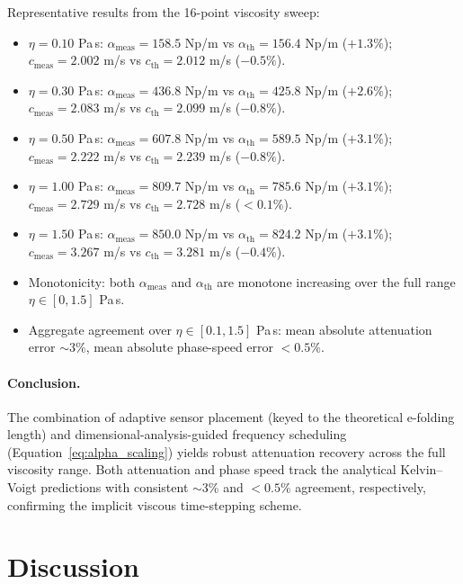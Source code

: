 \documentclass[11pt]{article}
\begin{document}
Representative results from the 16-point viscosity sweep:
\begin{itemize}[leftmargin=1.5em]
\item \(\eta=0.10\) Pa\,s: \(\alpha_{\mathrm{meas}}=158.5\) Np/m vs \(\alpha_{\mathrm{th}}=156.4\) Np/m (\(+1.3\%\)); \(c_{\mathrm{meas}}=2.002\) m/s vs \(c_{\mathrm{th}}=2.012\) m/s (\(-0.5\%\)).
\item \(\eta=0.30\) Pa\,s: \(\alpha_{\mathrm{meas}}=436.8\) Np/m vs \(\alpha_{\mathrm{th}}=425.8\) Np/m (\(+2.6\%\)); \(c_{\mathrm{meas}}=2.083\) m/s vs \(c_{\mathrm{th}}=2.099\) m/s (\(-0.8\%\)).
\item \(\eta=0.50\) Pa\,s: \(\alpha_{\mathrm{meas}}=607.8\) Np/m vs \(\alpha_{\mathrm{th}}=589.5\) Np/m (\(+3.1\%\)); \(c_{\mathrm{meas}}=2.222\) m/s vs \(c_{\mathrm{th}}=2.239\) m/s (\(-0.8\%\)).
\item \(\eta=1.00\) Pa\,s: \(\alpha_{\mathrm{meas}}=809.7\) Np/m vs \(\alpha_{\mathrm{th}}=785.6\) Np/m (\(+3.1\%\)); \(c_{\mathrm{meas}}=2.729\) m/s vs \(c_{\mathrm{th}}=2.728\) m/s (\(<0.1\%\)).
\item \(\eta=1.50\) Pa\,s: \(\alpha_{\mathrm{meas}}=850.0\) Np/m vs \(\alpha_{\mathrm{th}}=824.2\) Np/m (\(+3.1\%\)); \(c_{\mathrm{meas}}=3.267\) m/s vs \(c_{\mathrm{th}}=3.281\) m/s (\(-0.4\%\)).
\item Monotonicity: both \(\alpha_{\mathrm{meas}}\) and \(\alpha_{\mathrm{th}}\) are monotone increasing over the full range \(\eta\in[0,1.5]\) Pa\,s.
\item Aggregate agreement over \(\eta\in[0.1,1.5]\) Pa\,s: mean absolute attenuation error \(\sim\)3\%, mean absolute phase-speed error \(<0.5\%\).
\end{itemize}

\paragraph{Conclusion.}
The combination of adaptive sensor placement (keyed to the theoretical e-folding length) and dimensional-analysis-guided frequency scheduling (Equation~\eqref{eq:alpha_scaling}) yields robust attenuation recovery across the full viscosity range. Both attenuation and phase speed track the analytical Kelvin--Voigt predictions with consistent \(\sim\)3\% and \(<0.5\%\) agreement, respectively, confirming the implicit viscous time-stepping scheme.



\section{Discussion}
\label{sec:discussion}
\end{document}

